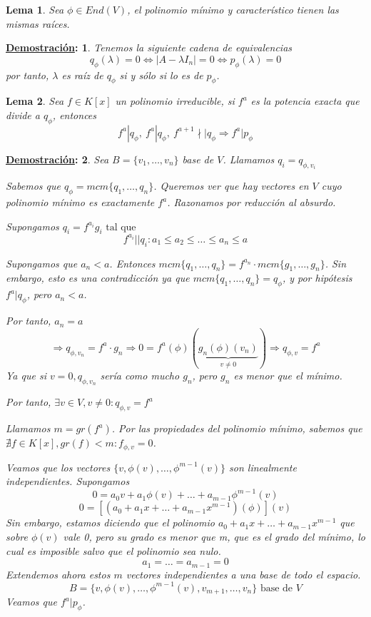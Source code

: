 \documentclass[10pt,a4paper,openright]{book}
\theoremstyle{break}
\newtheorem*{lema}{Lema}
\newtheorem*{demo}{\underline{Demostración}:}
\begin{document}
\begin{lema}
Sea $\phi \in End(V)$, el polinomio mínimo y característico tienen las mismas raíces.
\end{lema}
\begin{demo}
Tenemos la siguiente cadena de equivalencias
$$q_\phi(\lambda)=0\Leftrightarrow|A-\lambda I_n|=0\Leftrightarrow p_\phi(\lambda)=0$$
por tanto, $\lambda$ es raíz de $q_\phi$ si y sólo si lo es de $p_\phi$.
\end{demo}

\begin{lema}
Sea $f \in K[x]$ un polinomio irreducible, si $f^a$ es la potencia exacta que divide a $q_\phi$, entonces
$$f^a | q_\phi, \ f^a | q_\phi, \ f^{a+1} \nmid \mid q_\phi \Rightarrow f^a | p_\phi$$
\end{lema}
\begin{demo}
Sea $B = \{v_1, \ldots, v_n \}$ base de $V$. Llamamos $q_i = q_{\phi, v_i}$

Sabemos que $q_\phi = mcm \{q_1, \ldots, q_n\}$. Queremos ver que hay vectores en $V$ cuyo polinomio mínimo es exactamente $f^a$. Razonamos por reducción al absurdo.

Supongamos $q_i = f^{a_i} g_i \mbox{ tal que }$
$$f^{a_i} || q_i : a_1 \leq a_2 \leq \ldots \leq a_n \leq a$$

Supongamos que $a_n < a$. Entonces $ mcm \{q_1, \ldots, q_n\} = f^{a_n}  \cdot mcm \{g_1, \ldots, g_n\}$. Sin embargo, esto es una contradicción ya que $mcm \{q_1, \ldots, q_n\} = q_\phi$, y por hipótesis $f^a | q_\phi$, pero $a_n < a $.

Por tanto, $a_n = a$
$$\Rightarrow q_{\phi, v_n} = f^a \cdot g_n \Rightarrow 0 = f^a(\phi)(\underbrace{g_n(\phi)(v_n)}_{v \neq 0}) \Rightarrow q_{\phi, v} = f^a $$
Ya que si $v = 0, q_{\phi, v_n}$ sería como mucho $g_n$, pero $g_n$ es menor que el mínimo.

Por tanto, $\exists v \in V, v \neq 0 : q_{\phi, v} = f^a$

Llamamos $m = gr(f^a)$. Por las propiedades del polinomio mínimo, sabemos que $\nexists f \in K[x] , gr(f) < m : f_{\phi, v} = 0$.

Veamos que los vectores $\{v, \phi(v), \ldots, \phi^{m-1}(v)\}$ son linealmente independientes. Supongamos
$$ 0 = a_0 v + a_1 \phi(v) + \ldots + a_{m-1}\phi^{m-1}(v) $$
$$0 = \left[(a_0  + a_1 x + \ldots + a_{m-1}x^{m-1})(\phi)\right](v)$$
Sin embargo, estamos diciendo que el polinomio $a_0  + a_1 x + \ldots + a_{m-1}x^{m-1}$ que sobre $\phi(v)$ vale 0, pero su grado es menor que m, que es el grado del mínimo, lo cual es imposible salvo que el polinomio sea nulo.
$$a_1 = \ldots = a_{m-1} = 0$$
Extendemos ahora estos $m$ vectores independientes a una base de todo el espacio.
$$B = \{ v, \phi(v), \ldots, \phi^{m-1}(v), v_{m+1}, \ldots, v_n \} \mbox{ base de $V$}$$
Veamos que $f^a | p_\phi$.


\end{demo}
\end{document}
